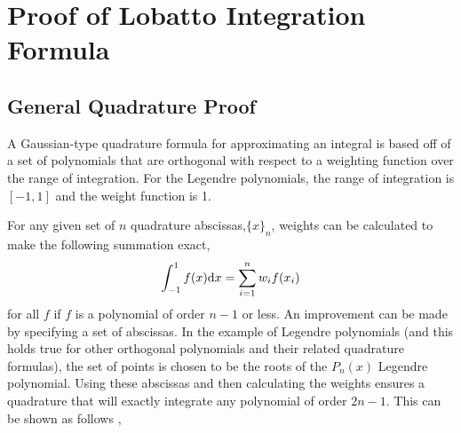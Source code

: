 \appendix

\section{Proof of Lobatto Integration Formula}
\label{lobatappend}

\subsection{General Quadrature Proof}
\label{genproof}
A Gaussian-type quadrature formula for approximating an integral is based off of
a set of polynomials that are orthogonal with respect to a weighting function over
the range of integration. For the Legendre polynomials, the range of integration is 
$[-1,1]$ and the weight function is 1. 

For any given set of $n$ quadrature abscissas,$\{x\}_n$, weights can be calculated to make
the following summation exact, 
\begin{equation}
\int_{-1}^{1} f(x){\rm d}x = \sum_{i=1}^nw_if(x_i)
\end{equation}
for all $f$ if $f$ is a polynomial of order $n-1$ or less. An improvement can be made
by specifying a set of abscissas. In the example of Legendre polynomials (and this holds
true for other orthogonal polynomials and their related quadrature formulas), the set
of points is chosen to be the roots of the $P_n(x)$ Legendre polynomial. Using these
abscissas and then calculating the weights ensures a quadrature that will exactly 
integrate any polynomial of order $2n-1$. This can be shown as follows
\cite{Burden_gaussquad}, 

